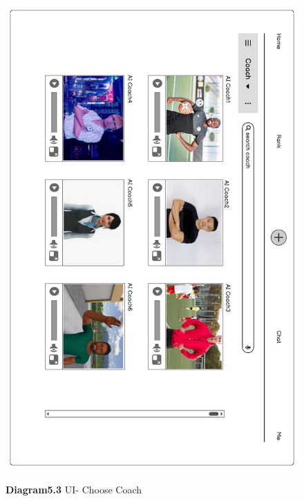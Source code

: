 \documentclass[a4paper]{article}
\begin{document}
	\begin{figure}[H]
		\centering
		\caption*{\textbf{Diagram5.3} UI- Choose Coach}
		\includegraphics[width=1\textwidth]{images/UI_Final/UI_Final_3.pdf}
		\label{UI_3}
	\end{figure}
\end{document}
